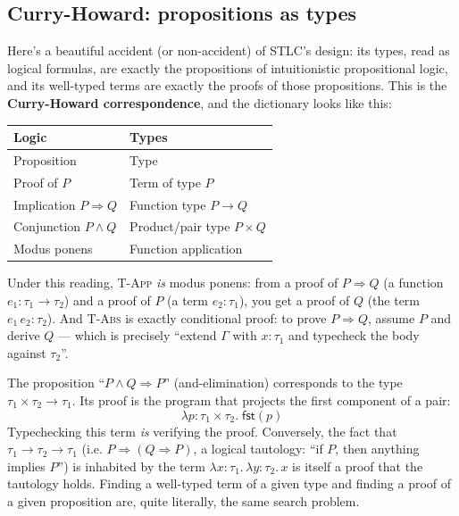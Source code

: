 \subsection{Curry-Howard: propositions as types}

Here's a beautiful accident (or non-accident) of STLC's design: its types, read as logical formulas, are exactly the propositions of intuitionistic propositional logic, and its well-typed terms are exactly the proofs of those propositions. This is the \textbf{Curry-Howard correspondence}, and the dictionary looks like this:

\begin{center}
\begin{tabular}{ll}
  \textbf{Logic} & \textbf{Types} \\
  \hline
  Proposition & Type \\
  Proof of $P$ & Term of type $P$ \\
  Implication $P \Rightarrow Q$ & Function type $P \to Q$ \\
  Conjunction $P \wedge Q$ & Product/pair type $P \times Q$ \\
  Modus ponens & Function application \\
\end{tabular}
\end{center}

Under this reading, \textsc{T-App} \emph{is} modus ponens: from a proof of $P \Rightarrow Q$ (a function $e_1 : \tau_1 \to \tau_2$) and a proof of $P$ (a term $e_2 : \tau_1$), you get a proof of $Q$ (the term $e_1\,e_2 : \tau_2$). And \textsc{T-Abs} is exactly conditional proof: to prove $P \Rightarrow Q$, assume $P$ and derive $Q$ — which is precisely ``extend $\Gamma$ with $x : \tau_1$ and typecheck the body against $\tau_2$''.

\begin{example}
The proposition ``$P \wedge Q \Rightarrow P$'' (and-elimination) corresponds to the type $\tau_1 \times \tau_2 \to \tau_1$. Its proof is the program that projects the first component of a pair:
\[
  \lambda p{:}\tau_1\times\tau_2.\; \mathsf{fst}(p)
\]
Typechecking this term \emph{is} verifying the proof. Conversely, the fact that $\tau_1 \to \tau_2 \to \tau_1$ (i.e. $P \Rightarrow (Q \Rightarrow P)$, a logical tautology: ``if $P$, then anything implies $P$'') is inhabited by the term $\lambda x{:}\tau_1.\,\lambda y{:}\tau_2.\,x$ is itself a proof that the tautology holds. Finding a well-typed term of a given type and finding a proof of a given proposition are, quite literally, the same search problem.
\end{example}

